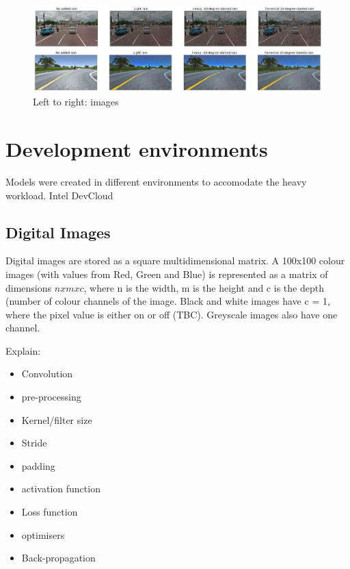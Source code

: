 \begin{figure}[h!]
\centering
\includegraphics[width=\textwidth]{Figures/AutomoldRain.png}
\caption{Left to right: images}
\label{fig:AutomoldRoadAugmentationLibrary}
\end{figure}

\section{Development environments}

Models were created in different environments to accomodate the heavy workload. Intel DevCloud 

\subsection{Digital Images}
Digital images are stored as a square multidimensional matrix. A 100x100 colour images (with values from Red, Green and Blue) is represented as a matrix of dimensions $n x m x c$, where n is the width, m is the height and c is the depth (number of colour channels of the image. Black and white images have c = 1, where the pixel value is either on or off (TBC). Greyscale images also have one channel.




Explain:  
\begin{itemize}
    \item Convolution
    \item pre-processing
    \item Kernel/filter size
    \item Stride
    \item padding
    \item activation function
    \item Loss function
    \item optimisers
    \item Back-propagation
\end{itemize}

